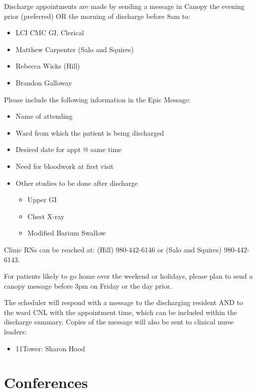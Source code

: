 \documentclass[
  letterpaper,
]{scrbook}
\providecommand{\tightlist}{%
  \setlength{\itemsep}{0pt}\setlength{\parskip}{0pt}}
\begin{document}
Discharge appointments are made by sending a message in Canopy the
evening prior (preferred) OR the morning of discharge before 8am to:

\begin{itemize}
\tightlist
\item
  LCI CMC GI, Clerical
\item
  Matthew Carpenter (Salo and Squires)
\item
  Rebecca Wicks (Hill)
\item
  Brandon Galloway
\end{itemize}

Please include the following information in the Epic Message:

\begin{itemize}
\tightlist
\item
  Name of attending
\item
  Ward from which the patient is being discharged
\item
  Desired date for appt @ same time
\item
  Need for bloodwork at first visit
\item
  Other studies to be done after discharge

  \begin{itemize}
  \tightlist
  \item
    Upper GI
  \item
    Chest X-ray
  \item
    Modified Barium Swallow
  \end{itemize}
\end{itemize}

Clinic RNs can be reached at: (Hill) 980-442-6146 or (Salo and Squires)
980-442-6143.

For patients likely to go home over the weekend or holidays, please plan
to send a canopy message before 3pm on Friday or the day prior.

The scheduler will respond with a message to the discharging resident
AND to the ward CNL with the appointment time, which can be included
within the discharge summary. Copies of the message will also be sent to
clinical nurse leaders:

\begin{itemize}
\tightlist
\item
  11Tower: Sharon Hood
\end{itemize}

\section{Conferences}\label{conferences}
\end{document}
